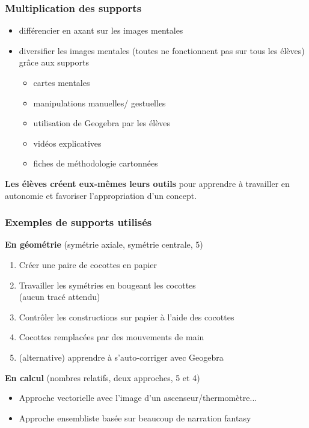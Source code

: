 \begin{frame}
    \frametitle{Multiplication des supports}
    \vfill
    \begin{itemize}
\item différencier en axant sur les images mentales
\item diversifier les images mentales (toutes ne fonctionnent pas sur tous les élèves) grâce aux supports
\begin{itemize}
\item cartes mentales
\item manipulations manuelles/ gestuelles
\item utilisation de Geogebra par les élèves
\item vidéos explicatives
\item fiches de méthodologie cartonnées
\end{itemize}
\end{itemize}
\vfill
\textbf{Les élèves créent eux-mêmes leurs outils} pour apprendre à travailler en autonomie et favoriser l'appropriation d'un concept.
\end{frame}

\begin{frame}
    \frametitle{Exemples de supports utilisés}
    \vfill
    \textbf{En géométrie} (symétrie axiale, symétrie centrale, 5)
    \begin{enumerate}
        \item Créer une paire de cocottes en papier
        \item Travailler les symétries en bougeant les cocottes\\(aucun tracé attendu)
        \item Contrôler les constructions sur papier à l'aide des cocottes
        \item Cocottes remplacées par des mouvements de main
        \item (alternative) apprendre à s'auto-corriger avec Geogebra
    \end{enumerate}
    
    \vfill
    
    \textbf{En calcul} (nombres relatifs, deux approches, 5 et 4)
    \begin{itemize}
        \item Approche vectorielle avec l'image d'un ascenseur/thermomètre...
        \item Approche ensembliste basée sur beaucoup de narration fantasy
    \end{itemize}
\end{frame}
